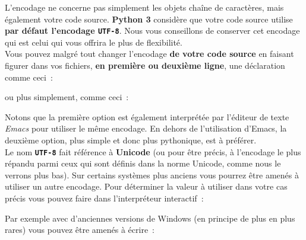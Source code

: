    L'encodage ne concerne pas simplement les objets chaîne de caractères,
mais également votre code source. \textbf{Python 3} considère que votre
code source utilise \textbf{par défaut l'encodage \texttt{UTF-8}}. Nous
vous conseillons de conserver cet encodage qui est celui qui vous
offrira le plus de flexibilité.\\

    Vous pouvez malgré tout changer l'encodage \textbf{de votre code source}
en faisant figurer dans vos fichiers, \textbf{en première ou deuxième
ligne}, une déclaration comme ceci~:

\begin{Shaded}
\begin{Highlighting}[]
\end{Highlighting}
\end{Shaded}

ou plus simplement, comme ceci~:

\begin{Shaded}
\begin{Highlighting}[]
\end{Highlighting}
\end{Shaded}

Notons que la première option est également interprétée par l'éditeur de
texte \emph{Emacs} pour utiliser le même encodage. En dehors de
l'utilisation d'Emacs, la deuxième option, plus simple et donc plus
pythonique, est à préférer.\\

    Le nom \textbf{\texttt{UTF-8}} fait référence à \textbf{Unicode} (ou
pour être précis, à l'encodage le plus répandu parmi ceux qui sont
définis dans la norme Unicode, comme nous le verrons plus bas). Sur
certains systèmes plus anciens vous pourrez être amenés à utiliser un
autre encodage. Pour déterminer la valeur à utiliser dans votre cas
précis vous pouvez faire dans l'interpréteur interactif~:

    \begin{Shaded}
\begin{Highlighting}[]
\end{Highlighting}
\end{Shaded}

    Par exemple avec d'anciennes versions de Windows (en principe de plus en
plus rares) vous pouvez être amenés à écrire~:

